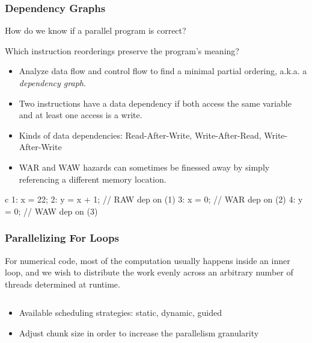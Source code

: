\documentclass[handout]{beamer}
\begin{document}
\begin{frame}[fragile]
  \frametitle{Dependency Graphs}

  How do we know if a parallel program is correct? 

  Which instruction reorderings preserve the program's meaning?

  \begin{itemize}

  \item Analyze data flow and control flow to find a minimal partial ordering, a.k.a. a \emph{dependency graph}.

  \item Two instructions have a data dependency if both access the same variable and at least one access is a write.

  \item Kinds of data dependencies: Read-After-Write, Write-After-Read, Write-After-Write

  \item WAR and WAW hazards can sometimes be finessed away by simply referencing a different memory location.

  \end{itemize}

      \begin{ccode}[]
        {c}
        1: x = 22;
        2: y = x + 1;     // RAW dep on (1)
        3: x = 0;         // WAR dep on (2)
        4: y = 0;         // WAW dep on (3)
      \end{ccode}
\end{frame}



\begin{frame}[fragile]
  \frametitle{Parallelizing For Loops}
  For numerical code, most of the computation usually happens inside an inner loop, and we wish to distribute the work evenly across an arbitrary number of threads determined at runtime.
  \begin{columns}[t]%
    \begin{column}{0.65\textwidth}
    \end{column}
    \pause
    \begin{column}{0.4\textwidth}
    \end{column}
  \end{columns}
  \pause
  \begin{itemize}
  \item Available scheduling strategies: static, dynamic, guided
  \item Adjust chunk size in order to increase the parallelism granularity
  \end{itemize}
\end{frame}
\end{document}
